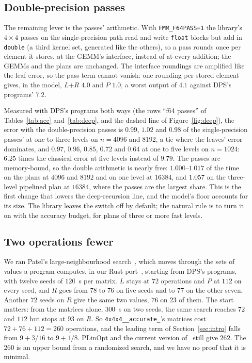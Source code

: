 \documentclass[11pt]{article}
\theoremstyle{remark}
\newcommand{\acct}{\texttt{4x4x4\_\allowbreak 48\_\allowbreak accurate\_\allowbreak 262}\xspace}
\begin{document}
\subsection{Double-precision passes}\label{sec:f64pass}

The remaining lever is the passes' arithmetic.  With \texttt{FMM\_F64PASS=1}
the library's $4\times4$ passes on the single-precision path read and
write \texttt{float} blocks but add in \texttt{double} (a third kernel
set, generated like the others), so a pass rounds once per element it
stores, at the GEMM's interface, instead of at every addition; the GEMMs
and the plans are unchanged.  The interface roundings are amplified
like the leaf error, so the pass term cannot vanish: one rounding per
stored element gives, in the model, $L$+$R$ $4.0$ and $P$ $1.0$, a worst
output of $4.1$ against DPS's programs' $7.2$.

Measured with DPS's programs both ways (the rows ``f64 passes'' of
Tables~\ref{tab:acc} and~\ref{tab:deep}, and the dashed line of
Figure~\ref{fig:deep}), the error with the double-precision passes is
$0.99$, $1.02$ and $0.98$ of the single-precision passes' at one to
three levels on $n=4096$ and $8192$, a tie where the leaves' error
dominates, and $0.97$, $0.96$, $0.85$, $0.72$ and $0.64$ at one to five
levels on $n=1024$: $6.25$ times the classical error at five levels
instead of $9.79$.  The passes are memory-bound, so the double
arithmetic is nearly free: $1.000$--$1.017$ of the time on the plans at
$4096$ and $8192$ and on one level at $16384$, and $1.057$ on the
three-level pipelined plan at $16384$, where the passes are the largest
share.  This is the first change that lowers the deep-recursion line,
and the model's floor accounts for its size.  The library leaves the
switch off by default; the natural rule is to turn it on with the
accuracy budget, for plans of three or more fast levels.

\subsection{Two operations fewer}\label{sec:260}

We ran Patel's large-neighbourhood search~\cite{Patel26}, which moves
through the sets of values a program computes, in our Rust
port~\cite{S26}, starting from DPS's programs, with twelve seeds of
$120$~s per matrix.  $L$ stays at
$72$ operations and $P$ at $112$ on every seed, and $R$ goes from $78$ to
$76$ on five seeds and to $77$ on the other seven.  Another $72$ seeds on
$R$ give the same two values, $76$ on $23$ of them.  The start matters:
from the matrices alone, $300$~s on two seeds, the same search reaches
$72$ and $112$ but stops at $93$ on $R$.  So \acct's matrices cost
$72+76+112=260$ operations, and the leading term of
Section~\ref{sec:intro} falls from $9+3/16$ to $9+1/8$.  PLinOpt and the
current version of~\cite{DPSST26} still give $262$.  The $260$ is an upper
bound from a randomized search, and we have no proof that it is minimal.
\end{document}
